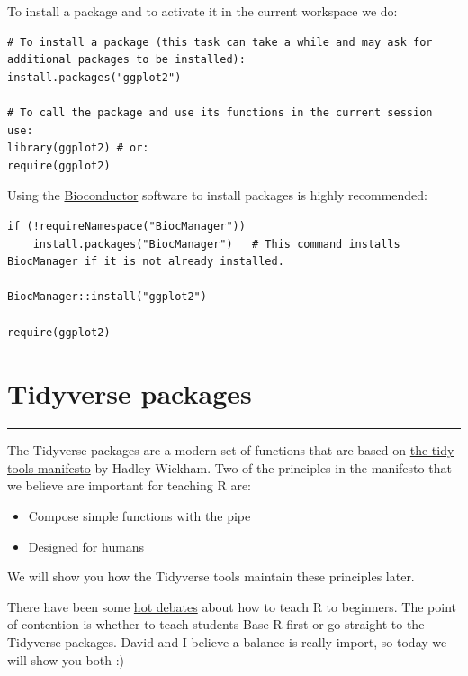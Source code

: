 \documentclass[
]{article}
\providecommand{\tightlist}{%
  \setlength{\itemsep}{0pt}\setlength{\parskip}{0pt}}
\begin{document}
To install a package and to activate it in the current workspace we do:

\begin{verbatim}
# To install a package (this task can take a while and may ask for additional packages to be installed):
install.packages("ggplot2")

# To call the package and use its functions in the current session use:
library(ggplot2) # or:
require(ggplot2)
\end{verbatim}

Using the \href{https://bioconductor.org/}{Bioconductor} software to
install packages is highly recommended:

\begin{verbatim}
if (!requireNamespace("BiocManager"))
    install.packages("BiocManager")   # This command installs BiocManager if it is not already installed. 

BiocManager::install("ggplot2")

require(ggplot2)
\end{verbatim}

\hypertarget{tidyverse-packages}{%
\section{Tidyverse packages}\label{tidyverse-packages}}

\begin{center}\rule{0.5\linewidth}{\linethickness}\end{center}

The Tidyverse packages are a modern set of functions that are based on
\href{https://cran.r-project.org/web/packages/tidyverse/vignettes/manifesto.html}{the
tidy tools manifesto} by Hadley Wickham. Two of the principles in the
manifesto that we believe are important for teaching R are:

\begin{itemize}
\tightlist
\item
  Compose simple functions with the pipe
\item
  Designed for humans
\end{itemize}

We will show you how the Tidyverse tools maintain these principles
later.

There have been some
\href{http://varianceexplained.org/r/teach-tidyverse/}{hot debates}
about how to teach R to beginners. The point of contention is whether to
teach students Base R first or go straight to the Tidyverse packages.
David and I believe a balance is really import, so today we will show
you both :)
\end{document}
